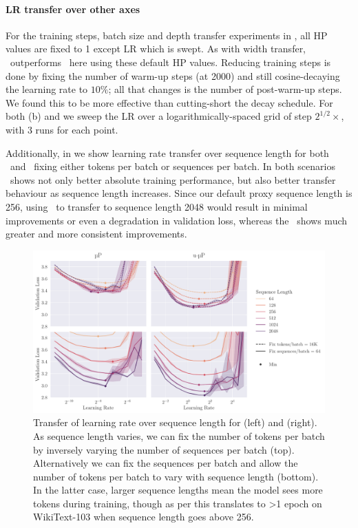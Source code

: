 \paragraph{LR transfer over other axes} For the training steps, batch size and depth transfer experiments in , all HP values are fixed to 1 except LR which is swept. As with width transfer, \umup\ outperforms \mup\ here using these default HP values. Reducing training steps is done by fixing the number of warm-up steps (at 2000) and still cosine-decaying the learning rate to $10\%$; all that changes is the number of post-warm-up steps. We found this to be more effective than cutting-short the decay schedule.
For both  (b) and  we sweep the LR over a logarithmically-spaced grid of step $2^{1/2} \times$, with 3 runs for each point.

Additionally, in  we show learning rate transfer over sequence length for both \mup\ and \umup\, fixing either tokens per batch or sequences per batch. In both scenarios \umup\ shows not only better absolute training performance, but also better transfer behaviour as sequence length increases. Since our default proxy sequence length is 256, using \mup\ to transfer to sequence length 2048 would result in minimal improvements or even a degradation in validation loss, whereas the \umup\ shows much greater and more consistent improvements.  

\begin{figure}[h]
    \includegraphics[width=\textwidth]{arXiv/figures/seqlen_transfer.pdf}
    \caption{Transfer of learning rate over sequence length for \mup{} (left) and \umup{} (right). As sequence length varies, we can fix the number of tokens per batch by inversely varying the number of sequences per batch (top). Alternatively we can fix the sequences per batch and allow the number of tokens per batch to vary with sequence length (bottom). In the latter case, larger sequence lengths mean the model sees more tokens during training, though as per  this translates to >1 epoch on WikiText-103 when sequence length goes above 256.}
    \label{fig:additional_experiments:lr_transfer_over_seqlen}
\end{figure}

